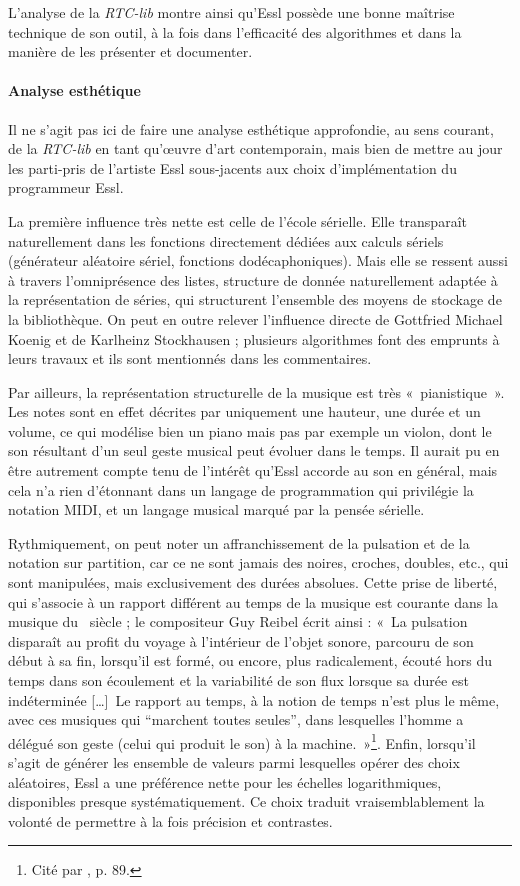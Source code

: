 \documentclass[a4paper,12pt]{article}
\newcommand{\guill}[1]{«~#1~»}
\newcommand{\guilldeux}[1]{“#1”}
\newcommand{\tpp}[0]{[\dots]}
\begin{document}
L'analyse de la \emph{RTC-lib} montre ainsi qu'Essl possède une bonne maîtrise technique de son outil, à la fois dans l'efficacité des algorithmes et dans la manière de les présenter et documenter.

\paragraph{Analyse esthétique \\}

Il ne s'agit pas ici de faire une analyse esthétique approfondie, au sens courant, de la \emph{RTC-lib} en tant qu'œuvre d'art contemporain, mais bien de mettre au jour les parti-pris de l'artiste Essl sous-jacents aux choix d'implémentation du programmeur Essl.

La première influence très nette est celle de l'école sérielle. Elle transparaît naturellement dans les fonctions directement dédiées aux calculs sériels (générateur aléatoire sériel, fonctions dodécaphoniques). Mais elle se ressent aussi à travers l'omniprésence des listes, structure de donnée naturellement adaptée à la représentation de séries, qui structurent l'ensemble des moyens de stockage de la bibliothèque. On peut en outre relever l'influence directe de Gottfried Michael Koenig et de Karlheinz Stockhausen ; plusieurs algorithmes font des emprunts à leurs travaux et ils sont mentionnés dans les commentaires.

Par ailleurs, la représentation structurelle de la musique est très \guill{pianistique}. Les notes sont en effet décrites par uniquement une hauteur, une durée et un volume, ce qui modélise bien un piano mais pas par exemple un violon, dont le son résultant d'un seul geste musical peut évoluer dans le temps. Il aurait pu en être autrement compte tenu de l'intérêt qu'Essl accorde au son en général, mais cela n'a rien d'étonnant dans un langage de programmation qui privilégie la notation MIDI, et un langage musical marqué par la pensée sérielle.

Rythmiquement, on peut noter un affranchissement de la pulsation et de la notation sur partition, car ce ne sont jamais des noires, croches, doubles, etc., qui sont manipulées, mais exclusivement des durées absolues. Cette prise de liberté, qui s'associe à un rapport différent au temps de la musique est courante dans la musique du \XXe~siècle ; le compositeur Guy Reibel écrit ainsi : \guill{La pulsation disparaît au profit du voyage à l'intérieur de l'objet sonore, parcouru de son début à sa fin, lorsqu'il est formé, ou encore, plus radicalement, écouté hors du temps dans son écoulement et la variabilité de son flux lorsque sa durée est indéterminée \tpp~Le rapport au temps, à la notion de temps n'est plus le même, avec ces musiques qui \guilldeux{marchent toutes seules}, dans lesquelles l'homme a délégué son geste (celui qui produit le son) à la machine.}\footnote{Cité par \cite{heinrich2003creation}, p. 89.}. Enfin, lorsqu'il s'agit de générer les ensemble de valeurs parmi lesquelles opérer des choix aléatoires, Essl a une préférence nette pour les échelles logarithmiques, disponibles presque systématiquement. Ce choix traduit vraisemblablement la volonté de permettre à la fois précision et contrastes. %
\end{document}
